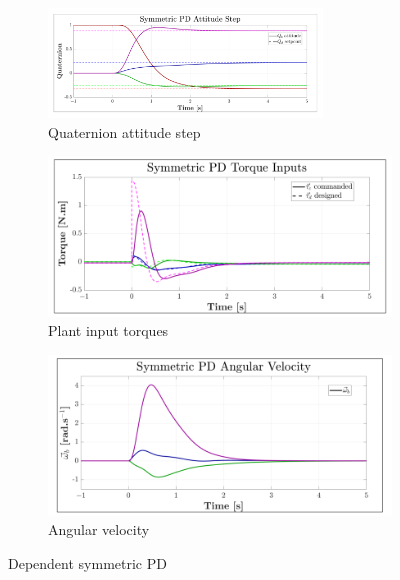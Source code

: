 \begin{figure}[htbp]
\centering
\begin{subfigure}{\textwidth}
\centering
\includegraphics[width=0.8\textwidth]{graphs/PD_3x3_Dependent_Step}
\caption{Quaternion attitude step}
\label{fig:PD_3x3_Dependent_Step}
\end{subfigure}
\begin{subfigure}{0.49\textwidth}
\centering
\includegraphics[width=\textwidth]{graphs/PD_3x3_Dependent_Torque}
\caption{Plant input torques}
\label{fig:PD_3x3_Dependent_Torque}
\end{subfigure}
\begin{subfigure}{0.49\textwidth}
\centering
\includegraphics[width=\textwidth]{graphs/PD_3x3_Dependent_Angular}
\caption{Angular velocity}
\label{fig:PD_3x3_Dependent_Angular}
\end{subfigure}
\caption{Dependent symmetric PD}
\end{figure}
